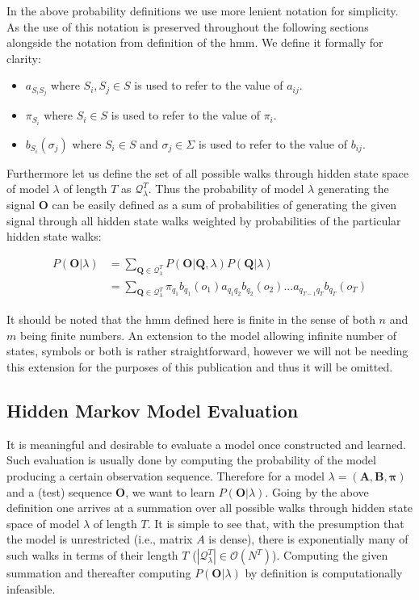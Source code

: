 In the above probability definitions we use more lenient notation for simplicity. As the use of this notation is preserved throughout the following sections alongside the notation from definition of the \gls{hmm}. We define it formally for clarity:
\begin{itemize}
	\item[] $a_{S_iS_j}$ where $S_i, S_j\in S$ is used to refer to the value of $a_{ij}$.
	\item[] $\pi_{S_i}$ where $S_i\in S$ is used to refer to the value of $\pi_i$.
	\item[] $b_{S_i}(\sigma_j)$ where $S_i\in S$ and $\sigma_j\in \Sigma$ is used to refer to the value of $b_{ij}$.
\end{itemize}

Furthermore let us define the set of all possible walks through hidden state space of model $\lambda$ of length $T$ as $\mathcal{Q}_\lambda^T$. Thus the probability of model $\lambda$ generating the signal $\mathbf{O}$ can be easily defined as a sum of probabilities of generating the given signal through all hidden state walks weighted by probabilities of the particular hidden state walks: 

\begin{align*}
P(\mathbf{O}|\lambda)&=\sum_{\mathbf{Q}\in\mathcal{Q}^T_\lambda}{P(\mathbf{O}|\mathbf{Q},\lambda)P(\mathbf{Q}|\lambda)}\\
&=\sum_{\mathbf{Q}\in\mathcal{Q}^T_\lambda}{\pi_{q_1}b_{q_1}(o_1)a_{q_1q_2}b_{q_2}(o_2)...a_{q_{T-1}q_T}b_{q_T}(o_T)}
\end{align*}

It should be noted that the \gls{hmm} defined here is finite in the sense of both $n$ and $m$ being finite numbers. An extension to the model allowing infinite number of states, symbols or both is rather straightforward, however we will not be needing this extension for the purposes of this publication and thus it will be omitted.

\subsection{Hidden Markov Model Evaluation}
It is meaningful and desirable to evaluate a model once constructed and learned. Such evaluation is usually done by computing the probability of the model producing a certain observation sequence. Therefore for a model $\lambda = (\mathbf{A}, \mathbf{B}, \boldsymbol{\pi})$ and a (test) sequence $\mathbf{O}$, we want to learn $P(\mathbf{O}|\lambda)$. Going by the above definition one arrives at a summation over all possible walks through hidden state space of model $\lambda$ of length $T$. It is simple to see that, with the presumption that the model is unrestricted (i.e., matrix $A$ is dense), there is exponentially many of such walks in terms of their length $T$ ($|\mathcal{Q}_\lambda^T|\in\mathcal{O}(N^T)$). Computing the given summation and thereafter computing $P(\mathbf{O}|\lambda)$ by definition is computationally infeasible.

